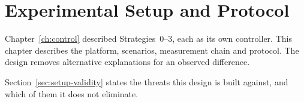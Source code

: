 %
%
%

\chapter{Experimental Setup and Protocol}
\label{ch:setup}

Chapter~\ref{ch:control} described Strategies~0--3, each as its own controller. This chapter
describes the platform, scenarios, measurement chain and protocol. The design removes alternative
explanations for an observed difference.

Section~\ref{sec:setup-validity} states the threats this design is built against, and which of
them it does not eliminate.

